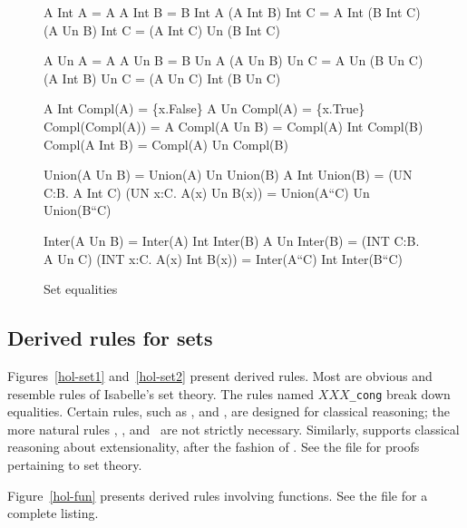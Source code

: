 \begin{figure} \makeatother
\begin{ttbox}
         A Int A = A
        A Int B = B Int A
          (A Int B) Int C  =  A Int (B Int C)
     (A Un B)  Int C  =  (A Int C) Un (B Int C)

          A Un A = A
         A Un B = B Un A
           (A Un B)  Un C  =  A Un (B Un C)
     (A Int B) Un C  =  (A Un C) Int (B Un C)

     A Int Compl(A) = \{x.False\} 
    A Un  Compl(A) = \{x.True\}
  Compl(Compl(A)) = A
           Compl(A Un B)  = Compl(A) Int Compl(B)
          Compl(A Int B) = Compl(A) Un Compl(B)

   Union(A Un B) = Union(A) Un Union(B)
    A Int Union(B) = (UN C:B. A Int C)
    (UN x:C. A(x) Un B(x)) = Union(A``C)  Un  Union(B``C)

   Inter(A Un B) = Inter(A) Int Inter(B)
     A Un Inter(B) = (INT C:B. A Un C)
   (INT x:C. A(x) Int B(x)) = Inter(A``C) Int Inter(B``C)
\end{ttbox}
\caption{Set equalities} \label{hol-equalities}
\end{figure}


\subsection{Derived rules for sets}
Figures~\ref{hol-set1} and~\ref{hol-set2} present derived rules.  Most
are obvious and resemble rules of Isabelle's {\ZF} set theory.  The
rules named $XXX${\tt_cong} break down equalities.  Certain rules, such as
,  and , are
designed for classical reasoning; the more natural rules ,
,  and~ are not
strictly necessary.  Similarly,  supports classical
reasoning about extensionality, after the fashion of .  See
the file  for proofs pertaining to set theory.

Figure~\ref{hol-fun} presents derived rules involving functions.  See
the file  for a complete listing.

